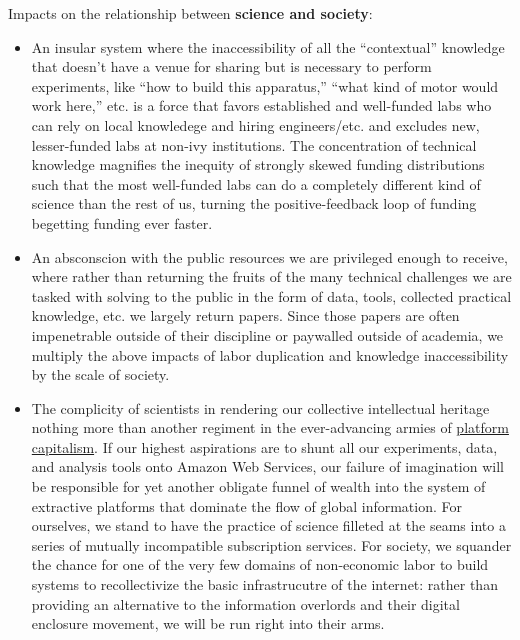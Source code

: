 Impacts on the relationship between \textbf{science and society}:

\begin{itemize}

\item
  An insular system where the inaccessibility of all the ``contextual''
  knowledge \citep{woolKnowledgeNetworksHow2020, barleyBackroomsScienceWork1994}  that doesn't have a venue for
  sharing but is necessary to perform experiments, like ``how to build
  this apparatus,'' ``what kind of motor would work here,'' etc. is a
  force that favors established and well-funded labs who can rely on
  local knowledege and hiring engineers/etc. and excludes new,
  lesser-funded labs at non-ivy institutions. The concentration of
  technical knowledge magnifies the inequity of strongly skewed funding
  distributions such that the most well-funded labs can do a completely
  different kind of science than the rest of us, turning the
  positive-feedback loop of funding begetting funding ever faster.
\item
  An absconscion with the public resources we are privileged enough to
  receive, where rather than returning the fruits of the many technical
  challenges we are tasked with solving to the public in the form of
  data, tools, collected practical knowledge, etc. we largely return
  papers. Since those papers are often impenetrable outside of their
  discipline or paywalled outside of academia, we multiply the above
  impacts of labor duplication and knowledge inaccessibility by the
  scale of society.
\item
  The complicity of scientists in rendering our collective intellectual
  heritage nothing more than another regiment in the ever-advancing
  armies of
  \protect\hyperlink{platforms-industry-capture-and-the-profit-motive}{platform
  capitalism}. If our highest aspirations are to shunt all our
  experiments, data, and analysis tools onto Amazon Web Services, our
  failure of imagination will be responsible for yet another obligate
  funnel of wealth into the system of extractive platforms that dominate
  the flow of global information. For ourselves, we stand to have the
  practice of science filleted at the seams into a series of mutually
  incompatible subscription services. For society, we squander the
  chance for one of the very few domains of non-economic labor to build
  systems to recollectivize the basic infrastrucutre of the internet:
  rather than providing an alternative to the information overlords and
  their digital enclosure movement, we will be run right into their
  arms.
\end{itemize}

